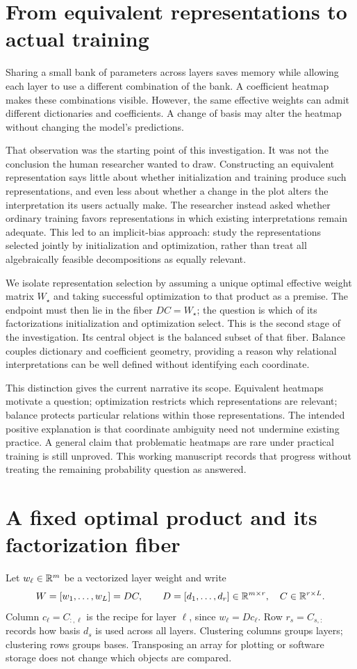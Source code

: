 \section{From equivalent representations to actual training}
Sharing a small bank of parameters across layers saves memory while allowing each layer to use a different combination of the bank. A coefficient heatmap makes these combinations visible. However, the same effective weights can admit different dictionaries and coefficients. A change of basis may alter the heatmap without changing the model's predictions.

That observation was the starting point of this investigation. It was not the conclusion the human researcher wanted to draw. Constructing an equivalent representation says little about whether initialization and training produce such representations, and even less about whether a change in the plot alters the interpretation its users actually make. The researcher instead asked whether ordinary training favors representations in which existing interpretations remain adequate. This led to an implicit-bias approach: study the representations selected jointly by initialization and optimization, rather than treat all algebraically feasible decompositions as equally relevant.

We isolate representation selection by assuming a unique optimal effective weight matrix $W_\star$ and taking successful optimization to that product as a premise. The endpoint must then lie in the fiber $DC=W_\star$; the question is which of its factorizations initialization and optimization select. This is the second stage of the investigation. Its central object is the balanced subset of that fiber. Balance couples dictionary and coefficient geometry, providing a reason why relational interpretations can be well defined without identifying each coordinate.

This distinction gives the current narrative its scope. Equivalent heatmaps motivate a question; optimization restricts which representations are relevant; balance protects particular relations within those representations. The intended positive explanation is that coordinate ambiguity need not undermine existing practice. A general claim that problematic heatmaps are rare under practical training is still unproved. This working manuscript records that progress without treating the remaining probability question as answered.

\section{A fixed optimal product and its factorization fiber}
Let $w_\ell\in\mathbb R^m$ be a vectorized layer weight and write
\begin{equation}\label{eq:model}
 W=[w_1,\ldots,w_L]=DC,\qquad
 D=[d_1,\ldots,d_r]\in\mathbb R^{m\times r},\quad C\in\mathbb R^{r\times L}.
\end{equation}
Column $c_\ell=C_{:,\ell}$ is the recipe for layer $\ell$, since $w_\ell=Dc_\ell$. Row $r_s=C_{s,:}$ records how basis $d_s$ is used across all layers. Clustering columns groups layers; clustering rows groups bases. Transposing an array for plotting or software storage does not change which objects are compared.

